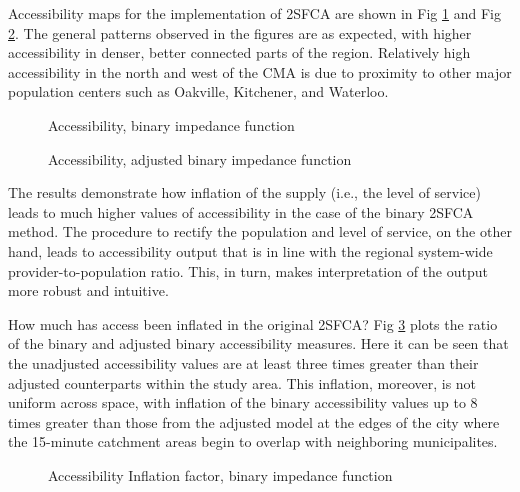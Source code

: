 \documentclass[10pt,letterpaper]{article}
\begin{document}
Accessibility maps for the implementation of 2SFCA are shown in Fig
\ref{fig:fig7-map-accessibility-binary} and Fig
\ref{fig:fig8-map-accessibility-binary-adjusted}. The general patterns
observed in the figures are as expected, with higher accessibility in
denser, better connected parts of the region. Relatively high
accessibility in the north and west of the CMA is due to proximity to
other major population centers such as Oakville, Kitchener, and
Waterloo.

\begin{figure}[htbp]
\centering
\caption{\label{fig:fig7-map-accessibility-binary}Accessibility, binary
impedance function}
\end{figure}

\begin{figure}[htbp]
\centering
\caption{\label{fig:fig8-map-accessibility-binary-adjusted}Accessibility,
adjusted binary impedance function}
\end{figure}

The results demonstrate how inflation of the supply (i.e., the level of
service) leads to much higher values of accessibility in the case of the
binary 2SFCA method. The procedure to rectify the population and level
of service, on the other hand, leads to accessibility output that is in
line with the regional system-wide provider-to-population ratio. This,
in turn, makes interpretation of the output more robust and intuitive.

How much has access been inflated in the original 2SFCA? Fig
\ref{fig:fig9-map-accessibility-binary-comparison} plots the ratio of
the binary and adjusted binary accessibility measures. Here it can be
seen that the unadjusted accessibility values are at least three times
greater than their adjusted counterparts within the study area. This
inflation, moreover, is not uniform across space, with inflation of the
binary accessibility values up to 8 times greater than those from the
adjusted model at the edges of the city where the 15-minute catchment
areas begin to overlap with neighboring municipalites.

\begin{figure}[htbp]
\centering
\caption{\label{fig:fig9-map-accessibility-binary-comparison}Accessibility
Inflation factor, binary impedance function}
\end{figure}
\end{document}
